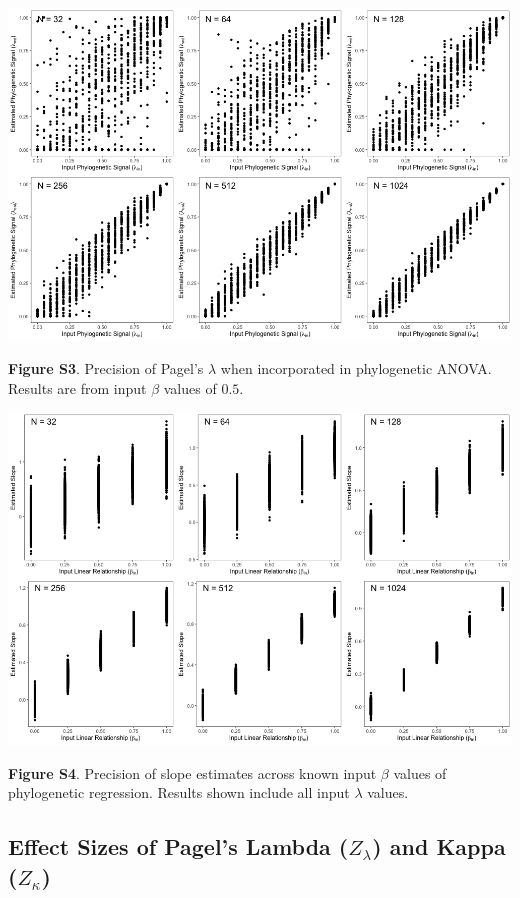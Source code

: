 \documentclass[]{article}
\begin{document}
\includegraphics[width=0.95\linewidth]{FigS3}

\textbf{Figure S3}. Precision of Pagel's \(\lambda\) when incorporated
in phylogenetic ANOVA. Results are from input \(\beta\) values of
\(0.5\). \hfill\break

\includegraphics[width=0.95\linewidth]{FigS4}

\textbf{Figure S4}. Precision of slope estimates across known input
\(\beta\) values of phylogenetic regression. Results shown include all
input \(\lambda\) values.

\hypertarget{effect-sizes-of-pagels-lambda-z_lambda-and-kappa-z_kappa}{%
\subsection{\texorpdfstring{Effect Sizes of Pagel's Lambda
(\(Z_\lambda\)) and Kappa
(\(Z_{\kappa}\))}{Effect Sizes of Pagel's Lambda (Z\_\textbackslash{}lambda) and Kappa (Z\_\{\textbackslash{}kappa\})}}\label{effect-sizes-of-pagels-lambda-z_lambda-and-kappa-z_kappa}}
\end{document}
